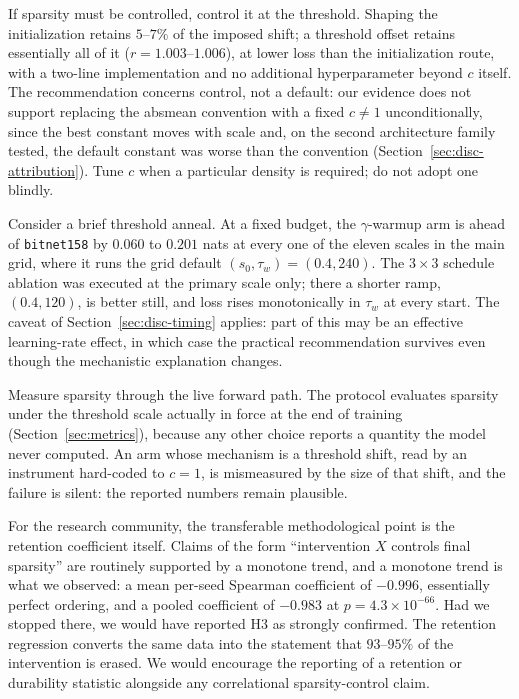 \documentclass[final,5p,times,twocolumn]{elsarticle}
\theoremstyle{remark}
\begin{document}
If sparsity must be controlled, control it at the threshold. Shaping the
initialization retains $5$--$7\%$ of the imposed shift; a threshold offset
retains essentially all of it ($r = 1.003$--$1.006$), at lower loss than the
initialization route, with a two-line implementation and no additional
hyperparameter beyond $c$ itself. The
recommendation concerns control, not a default: our evidence does not
support replacing the absmean convention with a fixed $c \neq 1$
unconditionally, since the best constant moves with scale and, on the second
architecture family tested, the default constant was worse than the convention
(Section~\ref{sec:disc-attribution}). Tune $c$ when a particular density is
required; do not adopt one blindly.

Consider a brief threshold anneal. At a fixed budget, the $\gamma$-warmup arm
is ahead of \texttt{bitnet158} by $0.060$ to $0.201$ nats at every one of the
eleven scales in the main grid, where it runs the grid default
$(s_0, \tau_w) = (0.4, 240)$. The $3 \times 3$ schedule ablation was executed
at the primary scale only; there a shorter ramp, $(0.4, 120)$, is better
still, and loss rises monotonically in $\tau_w$ at every start. The caveat of
Section~\ref{sec:disc-timing} applies: part of this may be an effective
learning-rate effect, in which case the practical recommendation survives even
though the mechanistic explanation changes.

Measure sparsity through the live forward path. The protocol evaluates
sparsity under the threshold scale actually in force at the end of training
(Section~\ref{sec:metrics}), because any other choice reports a quantity the
model never computed. An arm whose mechanism is a threshold shift, read by an
instrument hard-coded to $c = 1$, is mismeasured by the size of that shift,
and the failure is silent: the reported numbers remain plausible.

For the research community, the transferable methodological point is the
retention coefficient itself. Claims of the form ``intervention $X$ controls
final sparsity'' are routinely supported by a monotone trend, and a monotone
trend is what we observed: a mean per-seed Spearman coefficient of $-0.996$,
essentially perfect ordering, and a pooled coefficient of $-0.983$ at
$p = 4.3 \times 10^{-66}$. Had we stopped there, we would
have reported H3 as strongly confirmed. The retention regression converts the
same data into the statement that $93$--$95\%$ of the intervention is erased.
We would encourage the reporting of a retention or durability statistic
alongside any correlational sparsity-control claim.
\end{document}
